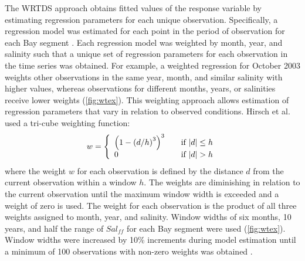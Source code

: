 \documentclass{svjour3}\usepackage[]{graphicx}\usepackage[]{color}
\begin{document}
The \ac{WRTDS} approach obtains fitted values of the response variable by estimating regression parameters for each unique observation.  Specifically, a regression model was estimated for each point in the period of observation for each Bay segment \cite{Hirsch10}. Each regression model was weighted by month, year, and salinity such that a unique set of regression parameters for each observation in the time series was obtained. For example, a weighted regression for October 2003 weights other observations in the same year, month, and similar salinity with higher values, whereas observations for different months, years, or salinities receive lower weights (\cref{fig:wtex}).  This weighting approach allows estimation of regression parameters that vary in relation to observed conditions.  Hirsch et al. \cite{Hirsch10} used a tri-cube weighting function:
\begin{equation}
w= \left\{ 
  \begin{array}{l l}
    \left(1-\left(d/h\right)^3\right)^3 & \quad \textrm{if } |d| \leq h \\
    0 & \quad \textrm{if } |d| > h 
  \end{array} \right.
\end{equation}
\noindent where the weight $w$ for each observation is defined by the distance $d$ from the current observation within a window $h$. The weights are diminishing in relation to the current observation until the maximum window width is exceeded and a weight of zero is used.  The weight for each observation is the product of all three weights assigned to month, year, and salinity.  Window widths of six months, 10 years, and half the range of $Sal_{ff}$ for each Bay segment were used (\cref{fig:wtex}).  Window widths were increased by 10\% increments during model estimation until a minimum of 100 observations with non-zero weights was obtained \cite{Hirsch10}.
\end{document}
